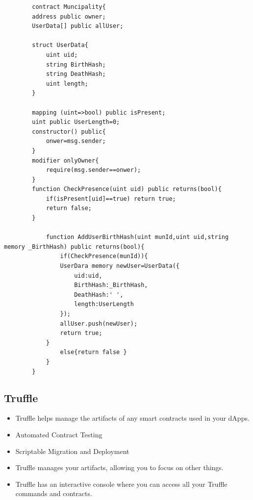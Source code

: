 \begin{lstlisting}
        contract Muncipality{
        address public owner;
        UserData[] public allUser;

        struct UserData{
            uint uid;
            string BirthHash;
            string DeathHash;
            uint length;
        }

        mapping (uint=>bool) public isPresent;
        uint public UserLength=0;
        constructor() public{
            onwer=msg.sender;
        }
        modifier onlyOwner{
            require(msg.sender==onwer);
        }
        function CheckPresence(uint uid) public returns(bool){
            if(isPresent[uid]==true) return true;
            return false;
        }
        
            function AddUserBirthHash(uint munId,uint uid,string memory _BirthHash) public returns(bool){
                if(CheckPresence(munId)){
                UserDara memory newUser=UserData({
                    uid:uid,
                    BirthHash:_BirthHash,
                    DeathHash:' ',
                    length:UserLength
                });
                allUser.push(newUser);
                return true;
            }
                else{return false }
            } 
        }

\end{lstlisting}

\subsection{Truffle}
\begin{itemize}
    \item Truffle helps manage the artifacts of any smart contracts used in your dApps. 
    \item Automated Contract Testing
    \item Scriptable Migration and Deployment
    \item Truffle manages your artifacts, allowing you to focus on other things.
    \item Truffle has an interactive console where you can access all your Truffle commands and contracts.
\end{itemize}

